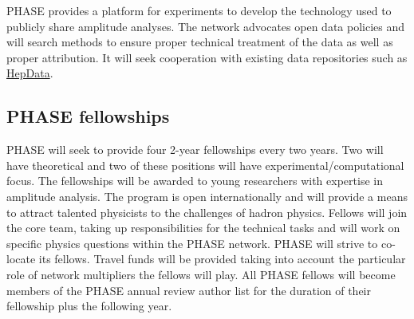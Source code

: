 PHASE provides a platform for experiments to develop the technology used to publicly share amplitude analyses. The network advocates open data policies and will search methods to ensure proper technical treatment of the data as well as proper attribution. It will seek cooperation with existing data repositories such as \href{https://hepdata.net/}{HepData}.


\subsection{PHASE fellowships}
\label{sec:fellowships}
PHASE will seek to provide four 2-year fellowships every two years. Two will have theoretical and two of these positions will have experimental/computational focus. The fellowships will be awarded to young researchers with expertise in amplitude analysis. The program is open internationally and will provide a means to attract talented physicists to the challenges of hadron physics. Fellows will join the core team, taking up responsibilities for the technical tasks and will work on specific physics questions within the PHASE network. PHASE will strive to co-locate its fellows. Travel funds will be provided taking into account the particular role of network multipliers the fellows will play. All PHASE fellows will become members of the PHASE annual review author list for the duration of their fellowship plus the following year.     
